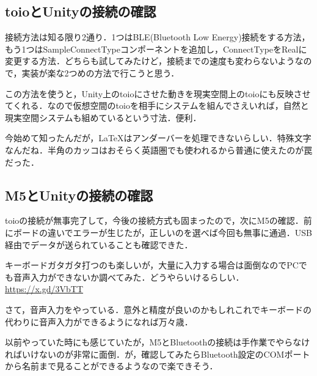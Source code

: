 \documentclass[fleqn,twocolumn]{mynote}
\begin{document}
\subsection*{toioとUnityの接続の確認}
接続方法は知る限り2通り．1つはBLE(Bluetooth Low Energy)接続をする方法，もう1つはSampleConnectTypeコンポーネントを追加し，ConnectTypeをRealに変更する方法．どちらも試してみたけど，接続までの速度も変わらないようなので，実装が楽な2つめの方法で行こうと思う．

この方法を使うと，Unity上のtoioにさせた動きを現実空間上のtoioにも反映させてくれる．なので仮想空間のtoioを相手にシステムを組んでさえいれば，自然と現実空間システムも組めているという寸法．便利．

今始めて知ったんだが，\LaTeX はアンダーバーを処理できないらしい．特殊文字なんだね．半角のカッコはおそらく英語圏でも使われるから普通に使えたのが罠だった．

\subsection*{M5とUnityの接続の確認}
toioの接続が無事完了して，今後の接続方式も固まったので，次にM5の確認．前にボードの違いでエラーが生じたが，正しいのを選べば今回も無事に通過．USB経由でデータが送られていることも確認できた．

キーボードガタガタ打つのも楽しいが，大量に入力する場合は面倒なのでPCでも音声入力ができないか調べてみた．どうやらいけるらしい．\\
\url{https://x.gd/3VbTT}

さて，音声入力をやっている．意外と精度が良いのかもしれこれでキーボードの代わりに音声入力ができるようになれば万々歳．

以前やっていた時にも感じていたが，M5とBluetoothの接続は手作業でやらなければいけないのが非常に面倒．が，確認してみたらBluetooth設定のCOMポートから名前まで見ることができるようなので楽できそう．
\end{document}
